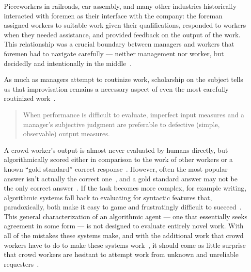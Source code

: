 \documentclass[street-level_algorithms]{subfiles}
\begin{document}
Pieceworkers in
railroads, car assembly, and many other industries
historically interacted with foremen as their interface with the company:
the foreman assigned workers to suitable work given their qualifications,
responded to workers when they needed assistance, and
provided feedback on the output of the work.
This relationship was a crucial boundary between
managers and workers that foremen had to navigate carefully
--- neither management nor worker, but decidedly and intentionally in the middle~\cite{10.2307/44135127}.

As much as managers attempt to routinize work,
scholarship on the subject tells us that %
improvisation remains a necessary aspect of even the most carefully routinized work~\cite{american1921problem,doi:10.1287/orsc.10.1.43}.

\begin{quote}
  When performance is difficult to evaluate,
  imperfect input measures and a manager's subjective judgment are preferable to defective
  (simple, observable) output measures. 
\end{quote}

A crowd worker's output is almost never evaluated by humans directly, but
algorithmically scored either in comparison to the work of other workers or
a known ``gold standard'' correct response~\cite{le2010ensuring}.
However,
often the most popular answer isn't actually the correct one~\cite{prelec2004bayesian}, and
a gold standard answer may not be the only correct answer~\cite{kairam2016parting}.
If the task becomes more complex,
for example writing,
algorithmic systems fall back to evaluating for syntactic features that,
paradoxically, both make it easy to game and frustratingly difficult to succeed~\cite{winerip2012facing}.
This general characterization of an algorithmic agent
--- one that essentially seeks agreement in some form ---
is not designed to evaluate entirely novel work.
With all of the mistakes these systems make, and
with the additional work that crowd workers have to do to make these systems work~\cite{taskSearch},
it should come as little surprise that
crowd workers are hesitant to attempt work from unknown and unreliable requesters~\cite{takingAHITMcInnis}.
\end{document}
